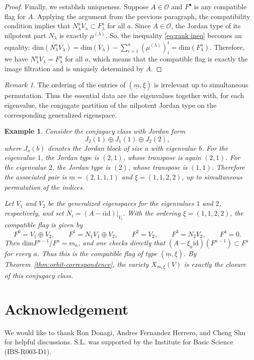 \documentclass[11pt]{amsart}
\theoremstyle{plain}
\newtheorem{example}[theorem]{Example}
\theoremstyle{definition}
\theoremstyle{remark}
\newtheorem{remark}[theorem]{Remark}
\newcommand{\id}{\mathrm{id}}
\newcommand{\cO}{\mathcal O}
\def\dim{\mathrm{dim}}
\def\uxi{{\underline{\xi}}}
\def\um{{\underline{m}}}
\begin{document}
\begin{proof}
Finally, we establish uniqueness. Suppose $A\in \cO$ and $F^\bullet$ is any compatible flag for $A$. Applying the argument from the previous paragraph, the compatibility condition implies that $N_\lambda^aV_\lambda\subset F^a_\lambda$ for all $a$. Since $A\in \cO$, the Jordan type of its nilpotent part $N_\lambda$ is exactly $\underline{\mu}^{(\lambda)}$. So, the inequality \ref{eq:rank ineq} becomes an equality: $\dim(N_\lambda^aV_\lambda) = \dim (V_\lambda) - \sum_{i=1}^a (\underline{\mu}^{(\lambda)})_i^t = \dim(F^a_\lambda)$. Therefore, we have $ N_\lambda^aV_\lambda=F^a_\lambda $ for all $a$, which means that the compatible flag is exactly the image filtration and is uniquely determined by $A$.
\end{proof}
\begin{remark}
	The ordering of the entries of $(\um,\uxi)$ is irrelevant up to simultaneous
	permutation. Thus the essential data are the eigenvalues together with, for
	each eigenvalue, the conjugate partition of the nilpotent Jordan type on the
	corresponding generalized eigenspace.
\end{remark}


\begin{example}\label{ex:2111}
	Consider the conjugacy class with Jordan form
	\[
	J_2(1)\oplus J_1(1)\oplus J_2(2),
	\]
	where $J_a(b)$ denotes the Jordan block of size $a$ with eigenvalue $b$.
	For the eigenvalue $1$, the Jordan type is $(2,1)$, whose transpose is again
	$(2,1)$. For the eigenvalue $2$, the Jordan type is $(2)$, whose transpose is
	$(1,1)$. Therefore the associated pair is
	$\um=(2,1,1,1)$ and $\uxi=(1,1,2,2)$, up to simultaneous permutation of the
	indices.
	
	Let $V_1$ and $V_2$ be the generalized eigenspaces for the eigenvalues $1$
	and $2$, respectively, and set $N_i=(A-i\id)|_{V_i}$. With the ordering
	$\uxi=(1,1,2,2)$, the compatible flag is given by
	\[
	F^0=V_1\oplus V_2,\qquad
	F^1=N_1V_1\oplus V_2,\qquad
	F^2=V_2,\qquad
	F^3=N_2V_2,\qquad
	F^4=0.
	\]
	Then $\dim F^{a-1}/F^a=m_a$, and one checks directly that
	$(A-\xi_a\id)(F^{a-1})\subset F^a$ for every $a$. Thus this is the compatible
	flag of type $(\um,\uxi)$. By Theorem~\ref{thm:orbit-correspondence}, the
	variety $X_{\um,\uxi}(V)$ is exactly the closure of this conjugacy class.
\end{example}



\section*{Acknowledgement}
\noindent We would like to thank Ron Donagi, Andres Fernandez Herrero, and Cheng Shu for helpful discussions.
S.L. was supported by the Institute for Basic Science (IBS-R003-D1).


\printbibliography
\end{document}
